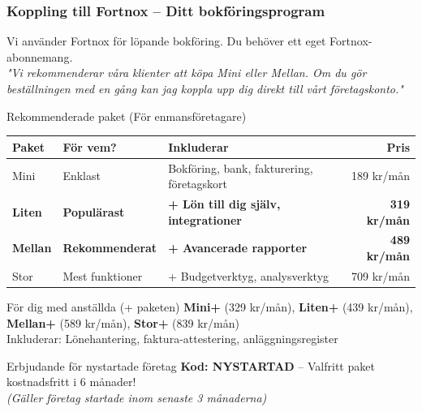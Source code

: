 \documentclass[10pt]{beamer}
\begin{document}
\begin{frame}[label=fortnoxkoppling]
  \frametitle{Koppling till Fortnox – Ditt bokföringsprogram}
  \small
  Vi använder Fortnox för löpande bokföring. Du behöver ett eget Fortnox-abonnemang.\\
  \textit{"Vi rekommenderar våra klienter att köpa Mini eller Mellan. Om du gör beställningen med en gång kan jag koppla upp dig direkt till vårt företagskonto."}
  
  \vspace{0.3cm}
  \begin{block}{Rekommenderade paket (För enmansföretagare)}
    \footnotesize
    \begin{tabular}{|l|l|p{5.5cm}|r|}
      \hline
      \textbf{Paket} & \textbf{För vem?} & \textbf{Inkluderar} & \textbf{Pris} \\
      \hline
      Mini & Enklast & Bokföring, bank, fakturering, företagskort & 189 kr/mån \\
      \hline
      \textbf{Liten} & \textbf{Populärast} & \textbf{+ Lön till dig själv, integrationer} & \textbf{319 kr/mån} \\
      \hline
      \textbf{Mellan} & \textbf{Rekommenderat} & \textbf{+ Avancerade rapporter} & \textbf{489 kr/mån} \\
      \hline
      Stor & Mest funktioner & + Budgetverktyg, analysverktyg & 709 kr/mån \\
      \hline
    \end{tabular}
  \end{block}
  
  \vspace{0.2cm}
  \begin{block}{För dig med anställda (+ paketen)}
    \footnotesize
    \textbf{Mini+} (329 kr/mån), \textbf{Liten+} (439 kr/mån), \textbf{Mellan+} (589 kr/mån), \textbf{Stor+} (839 kr/mån)\\
    Inkluderar: Lönehantering, faktura-attestering, anläggningsregister
  \end{block}
  
  \vspace{0.2cm}
  \begin{block}{Erbjudande för nystartade företag}
    \footnotesize
    \textbf{Kod: NYSTARTAD} – Valfritt paket kostnadsfritt i 6 månader!\\
    \textit{(Gäller företag startade inom senaste 3 månaderna)}
  \end{block}
  
  \vspace{0.3cm}
  \begin{center}
    \hyperlink{https://www.fortnox.se/paket}{}
  \end{center}
  
  \vspace{0.3cm}
  \begin{flushright}
    \hyperlink{bankrattigheter}{}
  \end{flushright}
\end{frame}
\end{document}
